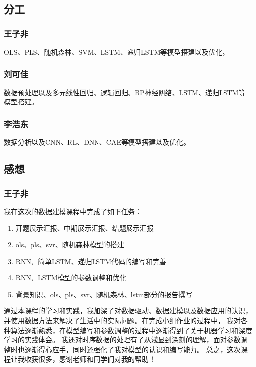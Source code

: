 \documentclass[11pt,a4paper]{elegantpaper}
\begin{document}
\begin{multicols}{2}
\subsection{分工}


\subsubsection{王子非}
OLS、PLS、随机森林、SVM、LSTM、递归LSTM等模型搭建以及优化。

\subsubsection{刘可佳}
数据预处理以及多元线性回归、逻辑回归、BP神经网络、LSTM、递归LSTM等模型搭建。

\subsubsection{李浩东}
数据分析以及CNN、RL、DNN、CAE等模型搭建以及优化。

\subsection{感想}

\subsubsection{王子非}

我在这次的数据建模课程中完成了如下任务：

\begin{enumerate}
  \item 开题展示汇报、中期展示汇报、结题展示汇报
  \item ols、pls、svr、随机森林模型的搭建
  \item RNN、简单LSTM、递归LSTM代码的编写和完善
  \item RNN、LSTM模型的参数调整和优化
  \item 背景知识、ols、pls、svr、随机森林、lstm部分的报告撰写
\end{enumerate}

通过本课程的学习和实践，我加深了对数据驱动、数据建模以及数据应用的认识，
并使用数据方法来解决了生活中的实际问题。在完成小组作业的过程中，
我对各种算法逐渐熟悉，在模型编写和参数调整的过程中逐渐得到了关于机器学习和深度学习的实践体会。
我还对时序数据的处理有了从浅显到深刻的理解，面对参数调整时也逐渐得心应手，同时还强化了我对模型的认识和编写能力。
总之，这次课程让我收获很多，感谢老师和同学们对我的帮助！


\end{multicols}
\end{document}

